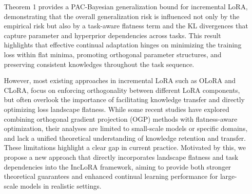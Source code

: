 \documentclass[letterpaper]{article} %
\begin{document}

Theorem 1 provides a PAC-Bayesian generalization bound for incremental LoRA, demonstrating that the overall generalization risk is influenced not only by the empirical risk but also by a task-aware flatness term and the KL divergences that capture parameter and hyperprior dependencies across tasks. This result highlights that effective continual adaptation hinges on minimizing the training loss within flat minima, promoting orthogonal parameter structures, and preserving consistent knowledges throughout the task sequence.

However, most existing approaches in incremental LoRA such as OLoRA and CLoRA, focus on enforcing orthogonality between different LoRA components, but often overlook the importance of facilitating knowledge transfer and directly optimizing loss landscape flatness. While some recent studies have explored combining orthogonal gradient projection (OGP) methods with flatness-aware optimization, their analyses are limited to small-scale models or specific domains, and lack a unified theoretical understanding of knowledge retention and transfer. These limitations highlight a clear gap in current practice. Motivated by this, we propose a new approach that directly incorporates landscape flatness and task dependencies into the IncLoRA framework, aiming to provide both stronger theoretical guarantees and enhanced continual learning performance for large-scale models in realistic settings.





\end{document}
